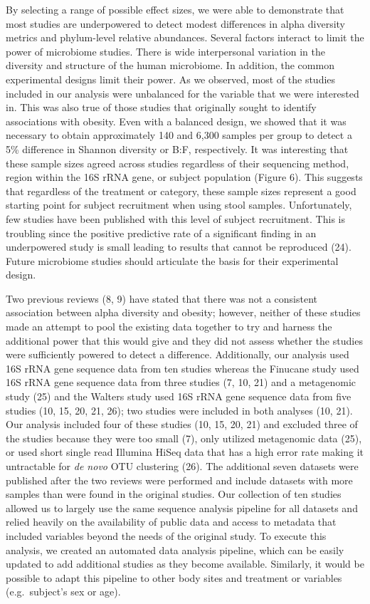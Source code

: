 \documentclass[12pt,]{article}
\begin{document}
By selecting a range of possible effect sizes, we were able to
demonstrate that most studies are underpowered to detect modest
differences in alpha diversity metrics and phylum-level relative
abundances. Several factors interact to limit the power of microbiome
studies. There is wide interpersonal variation in the diversity and
structure of the human microbiome. In addition, the common experimental
designs limit their power. As we observed, most of the studies included
in our analysis were unbalanced for the variable that we were interested
in. This was also true of those studies that originally sought to
identify associations with obesity. Even with a balanced design, we
showed that it was necessary to obtain approximately 140 and 6,300
samples per group to detect a 5\% difference in Shannon diversity or
B:F, respectively. It was interesting that these sample sizes agreed
across studies regardless of their sequencing method, region within the
16S rRNA gene, or subject population (Figure 6). This suggests that
regardless of the treatment or category, these sample sizes represent a
good starting point for subject recruitment when using stool samples.
Unfortunately, few studies have been published with this level of
subject recruitment. This is troubling since the positive predictive
rate of a significant finding in an underpowered study is small leading
to results that cannot be reproduced (24). Future microbiome studies
should articulate the basis for their experimental design.

Two previous reviews (8, 9) have stated that there was not a consistent
association between alpha diversity and obesity; however, neither of
these studies made an attempt to pool the existing data together to try
and harness the additional power that this would give and they did not
assess whether the studies were sufficiently powered to detect a
difference. Additionally, our analysis used 16S rRNA gene sequence data
from ten studies whereas the Finucane study used 16S rRNA gene sequence
data from three studies (7, 10, 21) and a metagenomic study (25) and the
Walters study used 16S rRNA gene sequence data from five studies (10,
15, 20, 21, 26); two studies were included in both analyses (10, 21).
Our analysis included four of these studies (10, 15, 20, 21) and
excluded three of the studies because they were too small (7), only
utilized metagenomic data (25), or used short single read Illumina HiSeq
data that has a high error rate making it untractable for \emph{de novo}
OTU clustering (26). The additional seven datasets were published after
the two reviews were performed and include datasets with more samples
than were found in the original studies. Our collection of ten studies
allowed us to largely use the same sequence analysis pipeline for all
datasets and relied heavily on the availability of public data and
access to metadata that included variables beyond the needs of the
original study. To execute this analysis, we created an automated data
analysis pipeline, which can be easily updated to add additional studies
as they become available. Similarly, it would be possible to adapt this
pipeline to other body sites and treatment or variables (e.g.~subject's
sex or age).
\end{document}

